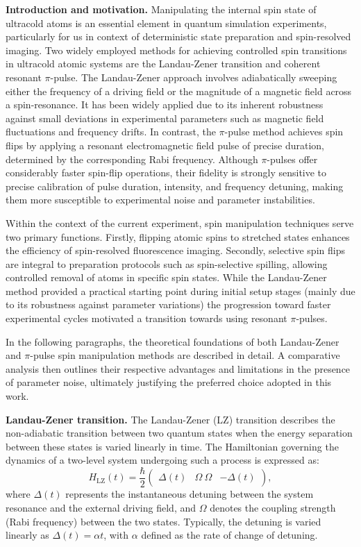 \textbf{Introduction and motivation.}
Manipulating the internal spin state of ultracold atoms is an essential element in quantum simulation experiments, particularly for us in context of deterministic state preparation and spin-resolved imaging.
Two widely employed methods for achieving controlled spin transitions in ultracold atomic systems are the Landau-Zener transition and coherent resonant $\pi$-pulse. The Landau-Zener approach involves adiabatically sweeping either the frequency of a driving field or the magnitude of a magnetic field across a spin-resonance. It has been widely applied due to its inherent robustness against small deviations in experimental parameters such as magnetic field fluctuations and frequency drifts. In contrast, the $\pi$-pulse method achieves spin flips by applying a resonant electromagnetic field pulse of precise duration, determined by the corresponding Rabi frequency. Although $\pi$-pulses offer considerably faster spin-flip operations, their fidelity is strongly sensitive to precise calibration of pulse duration, intensity, and frequency detuning, making them more susceptible to experimental noise and parameter instabilities.

Within the context of the current experiment, spin manipulation techniques serve two primary functions. Firstly, flipping atomic spins to stretched states enhances the efficiency of spin-resolved fluorescence imaging. Secondly, selective spin flips are integral to preparation protocols such as spin-selective spilling, allowing controlled removal of atoms in specific spin states. While the Landau-Zener method provided a practical starting point during initial setup stages (mainly due to its robustness against parameter variations) the progression toward faster experimental cycles motivated a transition towards using resonant $\pi$-pulses.

In the following paragraphs, the theoretical foundations of both Landau-Zener and $\pi$-pulse spin manipulation methods are described in detail. A comparative analysis then outlines their respective advantages and limitations in the presence of parameter noise, ultimately justifying the preferred choice adopted in this work.

\textbf{Landau-Zener transition.}
The Landau-Zener (LZ) transition \cite{landau_zur_1932,zener_non-adiabatic_1997} describes the non-adiabatic transition between two quantum states when the energy separation between these states is varied linearly in time. The Hamiltonian governing the dynamics of a two-level system undergoing such a process is expressed as:
\begin{equation}
H_{\text{LZ}}(t) = \frac{\hbar}{2}
\begin{pmatrix}
\Delta(t) & \Omega \
\Omega & -\Delta(t)
\end{pmatrix},
\label{eq:LZ_Hamiltonian}
\end{equation}
where $\Delta(t)$ represents the instantaneous detuning between the system resonance and the external driving field, and $\Omega$ denotes the coupling strength (Rabi frequency) between the two states. Typically, the detuning is varied linearly as $\Delta(t) = \alpha t$, with $\alpha$ defined as the rate of change of detuning.


